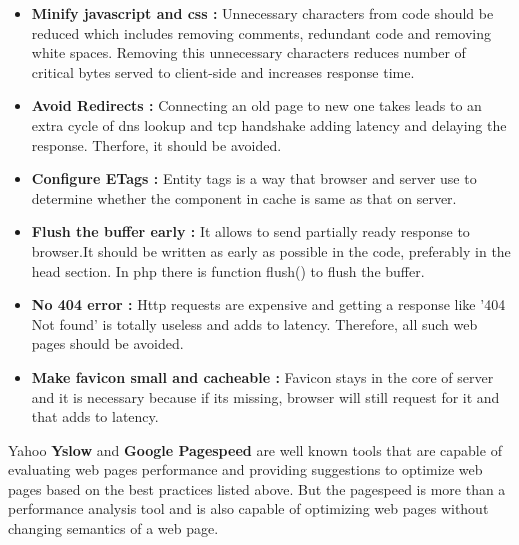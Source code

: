 \documentclass[conference]{IEEEtran}
\begin{document}
\begin{itemize}
\item \textbf{ Minify javascript and css :}
Unnecessary characters from code should be reduced which includes removing
comments, redundant code and removing white spaces. Removing this unnecessary
characters reduces number of critical bytes served to client-side and increases response time.

\item \textbf{Avoid Redirects :}
Connecting an old page to new one takes leads to an extra cycle of dns lookup and tcp handshake adding latency
and delaying the response. Therfore, it should be avoided.

\item \textbf{Configure ETags :}
Entity tags is a way that browser and server use to determine whether the
component in cache is same as that on server.

\item \textbf{Flush the buffer early :}
It allows to send partially ready response to browser.It should be written as
early as possible in the code, preferably in the head section.
In php there is function flush() to flush the buffer. 

\item \textbf{No 404 error :}
Http requests are expensive and getting a response like '404 Not found' is totally useless
and adds to latency. Therefore, all such web pages should be avoided.

\item \textbf{Make favicon small and cacheable :}
Favicon stays in the core of server and  it is necessary because if its missing,
browser will still request for it and that adds to latency.
\end{itemize}

Yahoo {\bf Yslow}\cite{yslow} and {\bf Google Pagespeed}\cite{gps} are well known tools that are capable of
evaluating web pages performance and providing suggestions to optimize web pages
based on the best practices listed above. But the pagespeed is more than a performance analysis
tool and is also capable of optimizing web pages without changing semantics of a web page.
\end{document}

